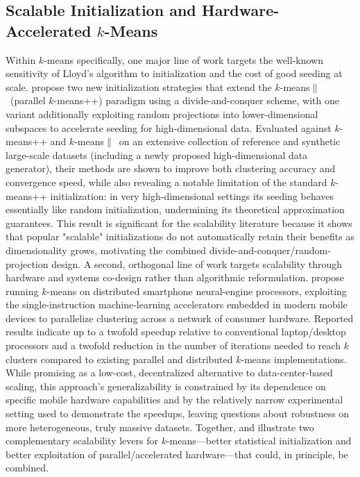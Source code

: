 \subsection{Scalable Initialization and Hardware-Accelerated $k$-Means}
Within $k$-means specifically, one major line of work targets the well-known sensitivity of Lloyd's algorithm to initialization and the cost of good seeding at scale. \cite{hamalainen2020improving} propose two new initialization strategies that extend the $k$-means$\|$\ (parallel $k$-means++) paradigm using a divide-and-conquer scheme, with one variant additionally exploiting random projections into lower-dimensional subspaces to accelerate seeding for high-dimensional data. Evaluated against $k$-means++ and $k$-means$\|$\ on an extensive collection of reference and synthetic large-scale datasets (including a newly proposed high-dimensional data generator), their methods are shown to improve both clustering accuracy and convergence speed, while also revealing a notable limitation of the standard $k$-means++ initialization: in very high-dimensional settings its seeding behaves essentially like random initialization, undermining its theoretical approximation guarantees. This result is significant for the scalability literature because it shows that popular "scalable" initializations do not automatically retain their benefits as dimensionality grows, motivating the combined divide-and-conquer/random-projection design. A second, orthogonal line of work targets scalability through hardware and systems co-design rather than algorithmic reformulation. \cite{awad2022improved} propose running $k$-means on distributed smartphone neural-engine processors, exploiting the single-instruction machine-learning accelerators embedded in modern mobile devices to parallelize clustering across a network of consumer hardware. Reported results indicate up to a twofold speedup relative to conventional laptop/desktop processors and a twofold reduction in the number of iterations needed to reach $k$ clusters compared to existing parallel and distributed $k$-means implementations. While promising as a low-cost, decentralized alternative to data-center-based scaling, this approach's generalizability is constrained by its dependence on specific mobile hardware capabilities and by the relatively narrow experimental setting used to demonstrate the speedups, leaving questions about robustness on more heterogeneous, truly massive datasets. Together, \cite{hamalainen2020improving} and \cite{awad2022improved} illustrate two complementary scalability levers for $k$-means---better statistical initialization and better exploitation of parallel/accelerated hardware---that could, in principle, be combined.


